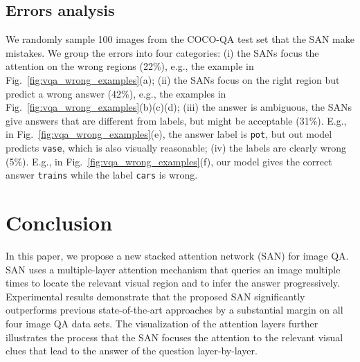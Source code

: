 \documentclass[10pt,twocolumn,letterpaper]{article}
\begin{document}
\subsection{Errors analysis}
We randomly sample 100 images from the COCO-QA test set that the SAN make
mistakes. We group the errors into four categories: (i) the SANs focus the
attention on the wrong regions (22\%), e.g., the example in
Fig.~\ref{fig:vqa_wrong_examples}(a); (ii) the SANs focus on the right region
but predict a wrong answer (42\%), e.g., the examples in
Fig.~\ref{fig:vqa_wrong_examples}(b)(c)(d); (iii) the answer is ambiguous, the
SANs give answers that are different from labels, but might be acceptable
(31\%). E.g., in Fig.~\ref{fig:vqa_wrong_examples}(e), the answer label is
\texttt{pot}, but out model predicts \texttt{vase}, which is also visually
reasonable; (iv) the labels are clearly wrong (5\%). E.g., in
Fig.~\ref{fig:vqa_wrong_examples}(f), our model gives the correct answer
\texttt{trains} while the label \texttt{cars} is wrong.

\vspace{-0.2cm}
\section{Conclusion}
In this paper, we propose a new stacked attention network (SAN) for image
QA. SAN uses a multiple-layer attention mechanism that queries an image
multiple times to locate the relevant visual region and to infer the answer
progressively. Experimental results demonstrate that the proposed SAN
significantly outperforms previous state-of-the-art approaches by a substantial
margin on all four image QA data sets. The visualization of the attention
layers further illustrates the process that the SAN focuses the attention to
the relevant visual clues that lead to the answer of the question
layer-by-layer.


\newpage
{\small


}
\end{document}
